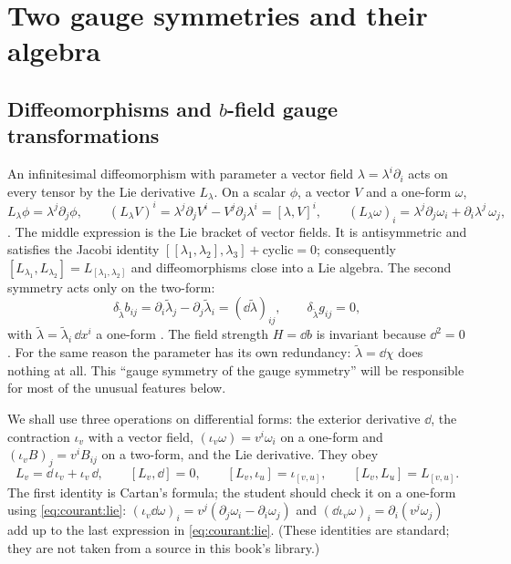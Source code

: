 \section{Two gauge symmetries and their algebra}\label{sec:courant:two}

\subsection{Diffeomorphisms and \texorpdfstring{$b$}{b}-field gauge transformations}

An infinitesimal diffeomorphism with parameter a vector field $\lambda=\lambda^i\partial_i$ acts
on every tensor by the Lie derivative $L_\lambda$. On a scalar $\phi$, a
vector $V$ and a one-form $\omega$,
\begin{equation}\label{eq:courant:lie}
L_\lambda\phi=\lambda^j\partial_j\phi,\qquad
(L_\lambda V)^i=\lambda^j\partial_jV^i-V^j\partial_j\lambda^i=[\lambda,V]^i,\qquad
(L_\lambda\omega)_i=\lambda^j\partial_j\omega_i+\partial_i\lambda^j\,\omega_j ,
\end{equation}
. The middle expression is the Lie
bracket of vector fields. It is antisymmetric and satisfies the Jacobi identity
$[[\lambda_1,\lambda_2],\lambda_3]+\text{cyclic}=0$; consequently
$[L_{\lambda_1},L_{\lambda_2}]=L_{[\lambda_1,\lambda_2]}$ and diffeomorphisms close into a Lie
algebra. The second symmetry acts only on the two-form:
\begin{equation}\label{eq:courant:bgauge}
\delta_{\tilde\lambda}b_{ij}=\partial_i\tilde\lambda_j-\partial_j\tilde\lambda_i
=(\dd\tilde\lambda)_{ij},\qquad \delta_{\tilde\lambda}g_{ij}=0 ,
\end{equation}
with $\tilde\lambda=\tilde\lambda_i\,\dd x^i$ a one-form . The field strength $H=\dd b$ is invariant because $\dd^2=0$. For the same reason
the parameter has its own redundancy: $\tilde\lambda=\dd\chi$ does nothing at all. This
``gauge symmetry of the gauge symmetry'' will be responsible for most of the unusual features
below.

We shall use three operations on differential forms: the exterior derivative $\dd$, the
contraction $\iota_v$ with a vector field, $(\iota_v\omega)=v^i\omega_i$ on a one-form and
$(\iota_vB)_j=v^iB_{ij}$ on a two-form, and the Lie derivative. They obey
\begin{equation}\label{eq:courant:cartan}
L_v=\dd\,\iota_v+\iota_v\,\dd,\qquad [L_v,\dd]=0,\qquad
[L_v,\iota_u]=\iota_{[v,u]},\qquad [L_v,L_u]=L_{[v,u]} .
\end{equation}
The first identity is Cartan's formula; the student should check it on a
one-form using \eqref{eq:courant:lie}: $(\iota_v\dd\omega)_i=v^j(\partial_j\omega_i-
\partial_i\omega_j)$ and $(\dd\iota_v\omega)_i=\partial_i(v^j\omega_j)$ add up to the last
expression in \eqref{eq:courant:lie}. (These identities are standard; they are not taken from a
source in this book's library.)

